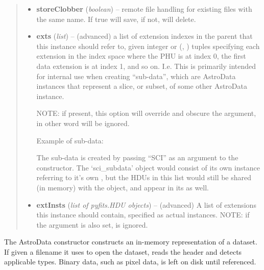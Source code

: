 \documentclass[letterpaper,10pt,english]{sphinxmanual}
\begin{document}
\begin{fulllineitems}
\begin{quote}
\begin{description}
\begin{itemize}
\item {} 
\textbf{storeClobber} (\emph{boolean}) -- remote file handling for existing files with the
same name.  If true will save, if not, will delete.

\item {} 
\textbf{exts} (\emph{list}) -- 
(advanced) a list of extension indexes in the parent
 that this instance should refer to, given  integer or 
(, ) tuples specifying each extension in the 
index space where the PHU is at index 0, the first data extension
is at index 1, and so on. I.e. This is primarily intended for 
internal use when creating ``sub-data'', which are AstroData instances
that represent a slice, or subset, of some other AstroData instance.

NOTE: if present, this option will override and obscure the 
argument, in other word  will be ignored.

Example of sub-data:
\begin{quote}

\end{quote}

The sub-data is created by passing ``SCI'' as an argument to the
constructor. The `sci\_subdata' object would consist of its own 
 instance referring to it's own , but the HDUs in
this list would still be shared (in memory) with the  object,
and appear in its  as well.


\item {} 
\textbf{extInsts} (\emph{list of pyfits.HDU objects}) -- (advanced) A list of extensions this instance should contain,
specified as actual  instances. NOTE: if the  argument
is also set,  is ignored.

\end{itemize}

\end{description}\end{quote}

The AstroData constructor constructs an in-memory representation of a
dataset. If given a filename it uses  to open the dataset, reads
the header and detects applicable types. Binary data, such as pixel
data, is left on disk until referenced.

\end{fulllineitems}
\end{document}
